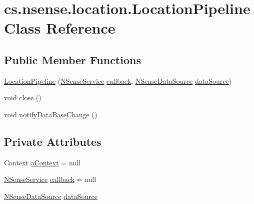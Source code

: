 \hypertarget{classcs_1_1nsense_1_1location_1_1_location_pipeline}{\section{cs.\-nsense.\-location.\-Location\-Pipeline Class Reference}
\label{classcs_1_1nsense_1_1location_1_1_location_pipeline}
}
\subsection*{Public Member Functions}
\begin{DoxyCompactItemize}
\item 
\hyperlink{classcs_1_1nsense_1_1location_1_1_location_pipeline_a62deb8cac595832606a69a248425a105}{Location\-Pipeline} (\hyperlink{classcs_1_1nsense_1_1_n_sense_service}{N\-Sense\-Service} \hyperlink{classcs_1_1nsense_1_1location_1_1_location_pipeline_afcdbeb2f3124b5691157458e2d30d9ee}{callback}, \hyperlink{classcs_1_1nsense_1_1db_1_1_n_sense_data_source}{N\-Sense\-Data\-Source} \hyperlink{classcs_1_1nsense_1_1location_1_1_location_pipeline_af961a79b95c12db602887805d44dc0d2}{data\-Source})
\item 
void \hyperlink{classcs_1_1nsense_1_1location_1_1_location_pipeline_a4a4f77cd08fc1f6a53815f674ae16a3b}{close} ()
\item 
void \hyperlink{classcs_1_1nsense_1_1location_1_1_location_pipeline_a1dae60692125d072bdaed32c7427930c}{notify\-Data\-Base\-Change} ()
\end{DoxyCompactItemize}
\subsection*{Private Attributes}
\begin{DoxyCompactItemize}
\item 
Context \hyperlink{classcs_1_1nsense_1_1location_1_1_location_pipeline_a088a4816ce7174ab8e12366afb66d601}{a\-Context} = null
\item 
\hyperlink{classcs_1_1nsense_1_1_n_sense_service}{N\-Sense\-Service} \hyperlink{classcs_1_1nsense_1_1location_1_1_location_pipeline_afcdbeb2f3124b5691157458e2d30d9ee}{callback} = null
\item 
\hyperlink{classcs_1_1nsense_1_1db_1_1_n_sense_data_source}{N\-Sense\-Data\-Source} \hyperlink{classcs_1_1nsense_1_1location_1_1_location_pipeline_af961a79b95c12db602887805d44dc0d2}{data\-Source}
\end{DoxyCompactItemize}
